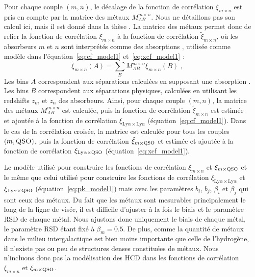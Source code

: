 Pour chaque couple $(m, n)$, le décalage de la fonction de corrélation $\xi_{m\times n}$ est pris en compte par la matrice des métaux $M_{AB}^{m\times n}$.
Nous ne détaillons pas son calcul ici, mais il est donné dans la thèse \textcite{DeSainteAgathe}. La matrice des métaux permet donc de relier la fonction de corrélation $\xi_{m\times n}$ à la fonction de corrélation $\tilde \xi_{m\times n}$, où les absorbeurs $m$ et $n$ sont interprétés comme des absorptions \lya{}, utilisée comme modèle dans l'équation~\ref{eq:cf_model1} et~\ref{eq:xcf_model1} :
\begin{equation}
  \tilde \xi_{m \times n}(A) = \sum_B M_{AB}^{m\times n} \xi_{m\times n}(B) \; ,
\end{equation}
Les bins $A$ correspondent aux séparations calculées en supposant une absorption \lya{}. Les bins $B$ correspondent aux séparations physiques, calculées en utilisant les redshifts $z_m$ et $z_n$ des absorbeurs.
Ainsi, pour chaque couple $(m, n)$, la matrice des métaux $M_{AB}^{m\times n}$ est calculée, puis la fonction de corrélation $\tilde \xi_{m \times n}$ est estimée et ajoutée à la fonction de corrélation $\xi_{\mathrm{Ly}\alpha\times\mathrm{Ly}\alpha}$ (équation~\ref{eq:cf_model1}).
Dans le cas de la corrélation croisée, la matrice est calculée pour tous les couples $(m, \textsc{QSO})$, puis la fonction de corrélation $\tilde \xi_{m \times \textsc{QSO}}$ et estimée et ajoutée à la fonction de corrélation $\xi_{\mathrm{Ly}\alpha\times\textsc{QSO}}$ (équation~\ref{eq:xcf_model1}).

Le modèle utilisé pour construire les fonctions de corrélation $\xi_{m\times n}$ et $\xi_{m\times \textsc{QSO}}$ et le même que celui utilisé pour construire les fonctions de corrélation $\xi_{\mathrm{Ly}\alpha\times\mathrm{Ly}\alpha}$ et $\xi_{\mathrm{Ly}\alpha\times\textsc{QSO}}$ (équation~\ref{eq:pk_model1}) mais avec les paramètres $b_i$, $b_j$, $\beta_i$ et $\beta_j$ qui sont ceux des métaux. Du fait que les métaux sont mesurables principalement le long de la ligne de visée, il est difficile d'ajuster à la fois le biais et le paramètre RSD de chaque métal. Nous ajustons donc uniquement le biais de chaque métal, le paramètre RSD étant fixé à $\beta_m = \num{0.5}$.
De plus, comme la quantité de métaux dans le milieu intergalactique est bien moins importante que celle de l'hydrogène, il n'existe pas ou peu de structures denses constituées de métaux. Nous n'incluons donc pas la modélisation des HCD dans les fonctions de corrélation $\xi_{m\times n}$ et $\xi_{m\times \textsc{QSO}}$.

